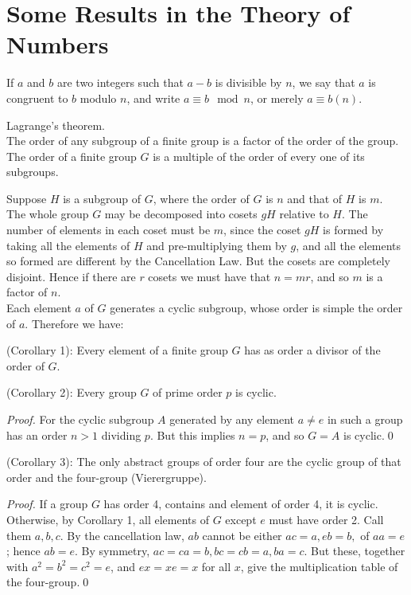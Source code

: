 \section{Some Results in the Theory of Numbers}

\begin{definition}
If $a$ and $b$ are two integers such that $a-b$ is divisible by $n$, we say that $a$ is congruent to $b$ modulo $n$, and write $a\equiv b\mod n$, or merely $a\equiv b(n)$.
\end{definition}


\begin{theorem}Lagrange's theorem.\\
The order of any subgroup of a finite group is a factor of the order of the group.\\
The order of a finite group $G$ is a multiple of the order of every one of its subgroups.
\end{theorem}

Suppose $H$ is a subgroup of $G$, where the order of $G$ is $n$ and that of $H$ is $m$.\\
The whole group $G$ may be decomposed into cosets $gH$ relative to $H$. The number of elements in each coset must be $m$, since the coset $gH$ is formed by
taking all the elements of $H$ and pre-multiplying them by $g$, and all the elements so formed are different by the Cancellation Law. But the cosets are completely disjoint.
Hence if there are $r$ cosets we must have that $n = mr$, and so $m$ is a factor of $n$.\\

Each element $a$ of $G$ generates a cyclic subgroup, whose order is simple the order of $a$. Therefore we have: 

\begin{corollary}{(Corollary 1):}
Every element of a finite group $G$ has as order a divisor of the order of $G$.
\end{corollary}

\begin{corollary}{(Corollary 2):}
Every group $G$ of prime order $p$ is cyclic.
\end{corollary}
\begin{proof}
For the cyclic subgroup $A$ generated by any element $a\ne e$ in such a group has an order $n>1$ dividing $p$. But this implies $n=p$, and so $G=A$ is cyclic.\qed
\end{proof}

\begin{corollary}{(Corollary 3):}
The only abstract groups of order four are the cyclic group of that order and the four-group (Vierergruppe).
\end{corollary}
\begin{proof}
If a group $G$ has order 4, contains and element of order 4, it is cyclic. Otherwise, by Corollary 1, all elements of $G$ except $e$ must have order 2. 
Call them $a, b, c$. By the cancellation law, $ab$ cannot be either $ac = a, eb = b,$ of $aa = e$; hence $ab=e$. By symmetry, $ac = ca = b, bc = cb = a, ba = c$. But these, together with $a^2 = b^2 =  c^2 = e$, and $ex = xe = x$ for all $x$, give the multiplication table of the four-group.\qed
\end{proof}

